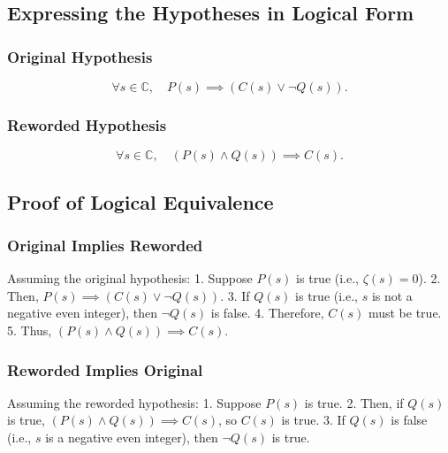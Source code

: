 \documentclass{article}
\begin{document}
\begin{itemize}
\end{itemize} \subsection{Expressing the Hypotheses in Logical Form} \subsubsection{Original Hypothesis} \[
\forall s \in \mathbb{C}, \quad P(s) \implies \left( C(s) \lor \neg Q(s) \right).
\] \subsubsection{Reworded Hypothesis} \[
\forall s \in \mathbb{C}, \quad \left( P(s) \land Q(s) \right) \implies C(s).
\] \subsection{Proof of Logical Equivalence} \subsubsection{Original Implies Reworded} Assuming the original hypothesis: 1. Suppose $P(s)$ is true (i.e., $\zeta(s) = 0$).
2. Then, $P(s) \implies \left( C(s) \lor \neg Q(s) \right)$.
3. If $Q(s)$ is true (i.e., $s$ is not a negative even integer), then $\neg Q(s)$ is false.
4. Therefore, $C(s)$ must be true.
5. Thus, $\left( P(s) \land Q(s) \right) \implies C(s)$. \subsubsection{Reworded Implies Original} Assuming the reworded hypothesis: 1. Suppose $P(s)$ is true.
2. Then, if $Q(s)$ is true, $\left( P(s) \land Q(s) \right) \implies C(s)$, so $C(s)$ is true.
3. If $Q(s)$ is false (i.e., $s$ is a negative even integer), then $\neg Q(s)$ is true.
\end{document}
